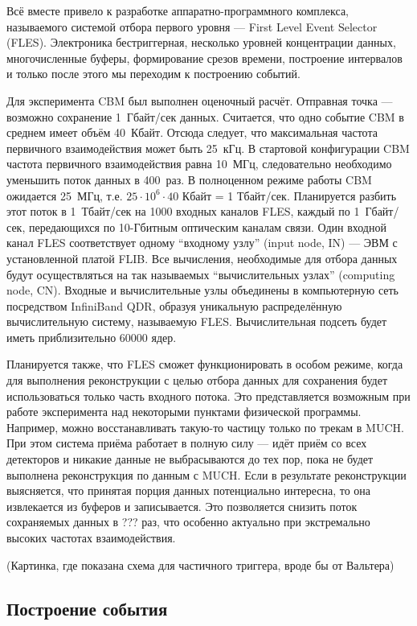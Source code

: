 Всё вместе привело к разработке аппаратно-программного комплекса, называемого системой отбора первого уровня --- First Level Event Selector (FLES).
Электроника бестриггерная, несколько уровней концентрации данных, многочисленные буферы, формирование срезов времени, построение интервалов и только после этого мы переходим к построению событий.

Для эксперимента CBM был выполнен оценочный расчёт. Отправная точка --- возможно сохранение 1~Гбайт/сек данных. Считается, что одно событие CBM в среднем имеет объём 40~Кбайт. Отсюда следует, что максимальная частота первичного взаимодействия может быть 25~кГц. В стартовой конфигурации CBM частота первичного взаимодействия равна 10~МГц, следовательно необходимо уменьшить поток данных в 400~раз. В полноценном режиме работы CBM ожидается 25~МГц, т.е. $ 25 \cdot 10^{6} \cdot 40 $ Кбайт = 1 Тбайт/сек. Планируется разбить этот поток в 1~Тбайт/сек на 1000 входных каналов FLES, каждый по 1~Гбайт/сек, передающихся по 10-Гбитным оптическим каналам связи. Один входной канал FLES соответствует одному ``входному узлу'' (input node, IN) --- ЭВМ с установленной платой FLIB. Все вычисления, необходимые для отбора данных будут осуществляться на так называемых ``вычислительных узлах'' (computing node, CN). Входные и вычислительные узлы объединены в компьютерную сеть посредством InfiniBand QDR, образуя уникальную распределённую вычислительную систему, называемую FLES. Вычислительная подсеть будет иметь приблизительно 60000 ядер.

Планируется также, что FLES сможет функционировать в особом режиме, когда для выполнения реконструкции с целью отбора данных для сохранения будет использоваться только часть входного потока. Это представляется возможным при работе эксперимента над некоторыми пунктами физической программы. Например, можно восстанавливать такую-то частицу только по трекам в MUCH. При этом система приёма работает в полную силу --- идёт приём со всех детекторов и никакие данные не выбрасываются до тех пор, пока не будет выполнена реконструкция по данным с MUCH. Если в результате реконструкции выясняется, что  принятая порция данных потенциально интересна, то она извлекается из буферов и записывается. Это позволяется снизить поток сохраняемых данных в ??? раз, что особенно актуально при экстремально высоких частотах взаимодействия.

(Картинка, где показана схема для частичного триггера, вроде бы от Вальтера)



\subsection{Построение события}\label{sec:secEventBuilding}

